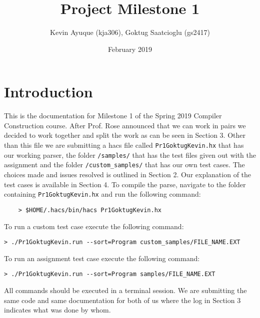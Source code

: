 \documentclass{article}
\title{Project Milestone 1}
\author{Kevin Ayuque (kja306), Goktug Saatcioglu (gs2417)}
\date{February 2019}
\begin{document}
\maketitle

\section{Introduction}
This is the documentation for Milestone 1 of the Spring 2019 Compiler Construction course. After Prof. Rose announced that we can work in pairs we decided to work together and split the work as can be seen in Section 3. Other than this file we are submitting a hacs file called \texttt{Pr1GoktugKevin.hx} that has our working parser, the folder \texttt{/samples/} that has the test files given out with the assignment and the folder \texttt{/custom\_samples/} that has our own test cases. The choices made and issues resolved is outlined in Section 2. Our explanation of the test cases is available in Section 4. To compile the parse, navigate to the folder containing \texttt{Pr1GoktugKevin.hx} and run the following command:
\begin{verbatim}
    > $HOME/.hacs/bin/hacs Pr1GoktugKevin.hx
\end{verbatim}
To run a custom test case execute the following command:
\begin{verbatim}
> ./Pr1GoktugKevin.run --sort=Program custom_samples/FILE_NAME.EXT
\end{verbatim}
To run an assignment test case execute the following command:
\begin{verbatim}
> ./Pr1GoktugKevin.run --sort=Program samples/FILE_NAME.EXT
\end{verbatim}
All commands should be executed in a terminal session. We are submitting the same code and same documentation for both of us where the log in Section 3 indicates what was done by whom.
\end{document}

